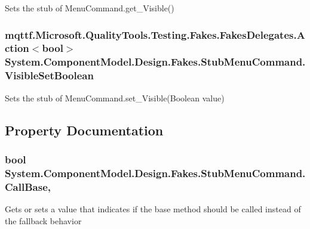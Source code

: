 Sets the stub of Menu\-Command.\-get\-\_\-\-Visible()

\hypertarget{class_system_1_1_component_model_1_1_design_1_1_fakes_1_1_stub_menu_command_a2280f3fd2857a171397466d9759261d4}{
\subsubsection[{Visible\-Set\-Boolean}]{\setlength{\rightskip}{0pt plus 5cm}mqttf.\-Microsoft.\-Quality\-Tools.\-Testing.\-Fakes.\-Fakes\-Delegates.\-Action$<$bool$>$ System.\-Component\-Model.\-Design.\-Fakes.\-Stub\-Menu\-Command.\-Visible\-Set\-Boolean}}\label{class_system_1_1_component_model_1_1_design_1_1_fakes_1_1_stub_menu_command_a2280f3fd2857a171397466d9759261d4}


Sets the stub of Menu\-Command.\-set\-\_\-\-Visible(\-Boolean value)



\subsection{Property Documentation}
\hypertarget{class_system_1_1_component_model_1_1_design_1_1_fakes_1_1_stub_menu_command_af43b61c0740e5f5e114aba35d371b08c}{
\subsubsection[{Call\-Base}]{\setlength{\rightskip}{0pt plus 5cm}bool System.\-Component\-Model.\-Design.\-Fakes.\-Stub\-Menu\-Command.\-Call\-Base\hspace{0.3cm}{\ttfamily [get]}, {\ttfamily [set]}}}\label{class_system_1_1_component_model_1_1_design_1_1_fakes_1_1_stub_menu_command_af43b61c0740e5f5e114aba35d371b08c}


Gets or sets a value that indicates if the base method should be called instead of the fallback behavior

